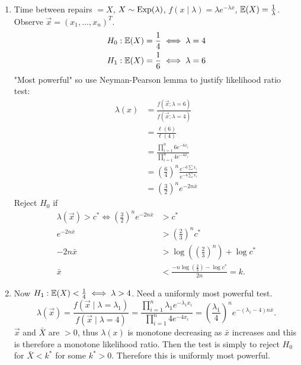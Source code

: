 \documentclass[10pt, a4paper]{article}
\begin{document}
\begin{problem}
    \begin{solution}\phantom{}
        \begin{enumerate}[label = 7.\arabic*]
            \item
            Time between repairs $= X$,
            $X \sim \operatorname{Exp}(\lambda)$,
            $f(x \mid \lambda) = \lambda e ^ {-\lambda x}$,
            $\mathbb{E}(X) = \frac{1}{\lambda}$.
            Observe $\vec{x} = (x_1, \dotsc, x_n) ^ T$.
            \begin{align*}
                H_0 &: \mathbb{E}(X) = \frac{1}{4} \iff \lambda = 4 \\
                H_1 &: \mathbb{E}(X) = \frac{1}{6} \iff \lambda = 6
            \end{align*}
            "Most powerful"
            so use Neyman-Pearson lemma to justify likelihood ratio test:
            \begin{align*}
                \lambda(x) &= \frac{f(\vec{x}; \lambda = 6)}{f(\vec{x}; \lambda = 4)} \\
                &= \frac{\ell(6)}{\ell(4)} \\
                &= \frac{\prod_{i = 1}^{n}6e ^ {-6x_i}}{\prod_{i = 1}^{n}4e ^ {-4x_i}} \\
                &= \left(\frac{6}{4}\right) ^ {n}\frac{e ^ {-6\sum x_i}}{e ^ {-4\sum x_i}} \\
                &= \left(\frac{3}{2}\right) ^ ne ^ {-2n\bar{x}}
            \end{align*}
            Reject $H_0$ if 
            \begin{align*}
                \lambda(\vec{x}) > c ^ {*} \iff \left(\frac{3}{2}\right) ^ ne ^ {-2n\bar{x}} &> c ^ {*} \\
                e ^ {-2n\bar{x}} &> \left(\frac{2}{3}\right) ^ nc ^ {*} \\
                -2n\bar{x} &> \log\left(\left(\frac{2}{3}\right) ^ n\right) + \log{c ^ {*}} \\
                \bar{x} &< \frac{-n\log\left(\frac{2}{3}\right) - \log{c ^ {*}}}{2n} = k.
            \end{align*}

            \item
            Now $H_1 : \mathbb{E}(X) < \frac{1}{4} \iff \lambda > 4$.
            Need a uniformly most powerful test.
            \[
            \lambda(\vec{x}) = \frac{f(\vec{x} \mid \lambda = \lambda_1)}{f(\vec{x} \mid \lambda = 4)} = \frac{\prod_{i = 1}^{n}\lambda_1e ^ {-\lambda_1x_i}}{\prod_{i = 1}^{n}4e ^ {-4x_i}} = \left(\frac{\lambda_1}{4}\right) ^ ne ^ {-(\lambda_1 - 4)n\bar{x}}.
            \]
            $\vec{x}$ and $\bar{X}$ are $> 0$,
            thus $\lambda(x)$ is monotone decreasing as $\bar{x}$ increases and this is therefore a monotone likelihood ratio.
            Then the test is simply to reject $H_0$ for $\bar{X} < k ^ {*}$ for some $k ^ {*} > 0$.
            Therefore this is uniformly most powerful.
        \end{enumerate}
    \end{solution}
\end{problem}
\end{document}
